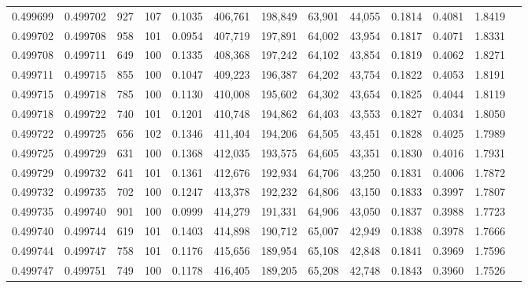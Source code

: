 \begin{tabular}{rrrrrrrrrrrrr}
0.499699 & 0.499702 &   927 & 107 &                                     0.1035 & 406,761 & 198,849 &  63,901 &  44,055 & 0.1814 & 0.4081 & 1.8419 \\
0.499702 & 0.499708 &   958 & 101 &                                     0.0954 & 407,719 & 197,891 &  64,002 &  43,954 & 0.1817 & 0.4071 & 1.8331 \\
0.499708 & 0.499711 &   649 & 100 &                                     0.1335 & 408,368 & 197,242 &  64,102 &  43,854 & 0.1819 & 0.4062 & 1.8271 \\
0.499711 & 0.499715 &   855 & 100 &                                     0.1047 & 409,223 & 196,387 &  64,202 &  43,754 & 0.1822 & 0.4053 & 1.8191 \\
0.499715 & 0.499718 &   785 & 100 &                                     0.1130 & 410,008 & 195,602 &  64,302 &  43,654 & 0.1825 & 0.4044 & 1.8119 \\
0.499718 & 0.499722 &   740 & 101 &                                     0.1201 & 410,748 & 194,862 &  64,403 &  43,553 & 0.1827 & 0.4034 & 1.8050 \\
0.499722 & 0.499725 &   656 & 102 &                                     0.1346 & 411,404 & 194,206 &  64,505 &  43,451 & 0.1828 & 0.4025 & 1.7989 \\
0.499725 & 0.499729 &   631 & 100 &                                     0.1368 & 412,035 & 193,575 &  64,605 &  43,351 & 0.1830 & 0.4016 & 1.7931 \\
0.499729 & 0.499732 &   641 & 101 &                                     0.1361 & 412,676 & 192,934 &  64,706 &  43,250 & 0.1831 & 0.4006 & 1.7872 \\
0.499732 & 0.499735 &   702 & 100 &                                     0.1247 & 413,378 & 192,232 &  64,806 &  43,150 & 0.1833 & 0.3997 & 1.7807 \\
0.499735 & 0.499740 &   901 & 100 &                                     0.0999 & 414,279 & 191,331 &  64,906 &  43,050 & 0.1837 & 0.3988 & 1.7723 \\
0.499740 & 0.499744 &   619 & 101 &                                     0.1403 & 414,898 & 190,712 &  65,007 &  42,949 & 0.1838 & 0.3978 & 1.7666 \\
0.499744 & 0.499747 &   758 & 101 &                                     0.1176 & 415,656 & 189,954 &  65,108 &  42,848 & 0.1841 & 0.3969 & 1.7596 \\
0.499747 & 0.499751 &   749 & 100 &                                     0.1178 & 416,405 & 189,205 &  65,208 &  42,748 & 0.1843 & 0.3960 & 1.7526 \\

\end{tabular}
